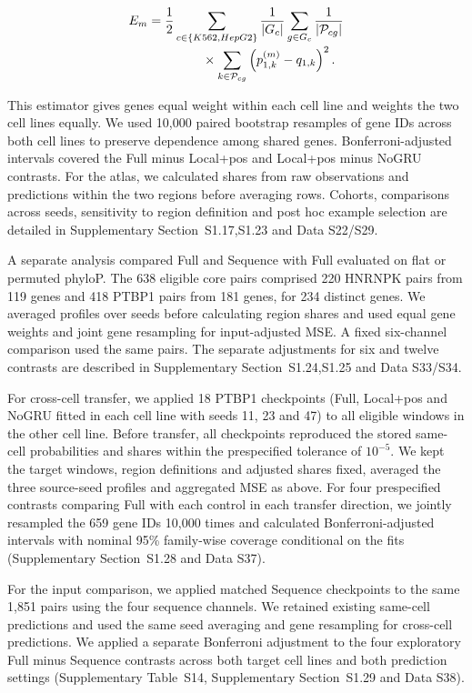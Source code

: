 \documentclass[webpdf,contemporary,large]{current_assets/oup-authoring-template}
\newcommand{\suptab}[1]{Supplementary Table~#1}
\newcommand{\supsect}[1]{Supplementary Section~#1}
\begin{document}
\begin{equation}
\begin{aligned}
E_m&=\frac12\sum_{c\in\{K562,HepG2\}}\frac1{|G_c|}
\sum_{g\in G_c}\frac1{|\mathcal P_{cg}|}\\[-2pt]
&\hspace{15mm}\times\sum_{k\in\mathcal P_{cg}}
\left(p_{1,k}^{(m)}-q_{1,k}\right)^2 .
\end{aligned}
\label{eq:allocation_estimator}
\end{equation}

This estimator gives genes equal weight within each cell line and weights the two cell lines equally. We used 10,000 paired bootstrap resamples of gene IDs across both cell lines to preserve dependence among shared genes. Bonferroni-adjusted intervals covered the Full minus Local+pos and Local+pos minus NoGRU contrasts. For the atlas, we calculated shares from raw observations and predictions within the two regions before averaging rows. Cohorts, comparisons across seeds, sensitivity to region definition and post hoc example selection are detailed in \supsect{S1.17,S1.23} and Data S22/S29.

A separate analysis compared Full and Sequence with Full evaluated on flat or permuted phyloP. The 638 eligible core pairs comprised 220 HNRNPK pairs from 119 genes and 418 PTBP1 pairs from 181 genes, for 234 distinct genes. We averaged profiles over seeds before calculating region shares and used equal gene weights and joint gene resampling for input-adjusted MSE. A fixed six-channel comparison used the same pairs. The separate adjustments for six and twelve contrasts are described in \supsect{S1.24,S1.25} and Data S33/S34.

For cross-cell transfer, we applied 18 PTBP1 checkpoints (Full, Local+pos and NoGRU fitted in each cell line with seeds 11, 23 and 47) to all eligible windows in the other cell line. Before transfer, all checkpoints reproduced the stored same-cell probabilities and shares within the prespecified tolerance of $10^{-5}$. We kept the target windows, region definitions and adjusted shares fixed, averaged the three source-seed profiles and aggregated MSE as above. For four prespecified contrasts comparing Full with each control in each transfer direction, we jointly resampled the 659 gene IDs 10,000 times and calculated Bonferroni-adjusted intervals with nominal 95\% family-wise coverage conditional on the fits (\supsect{S1.28} and Data S37).

For the input comparison, we applied matched Sequence checkpoints to the same 1,851 pairs using the four sequence channels. We retained existing same-cell predictions and used the same seed averaging and gene resampling for cross-cell predictions. We applied a separate Bonferroni adjustment to the four exploratory Full minus Sequence contrasts across both target cell lines and both prediction settings (\suptab{S14}, \supsect{S1.29} and Data S38).
\end{document}
